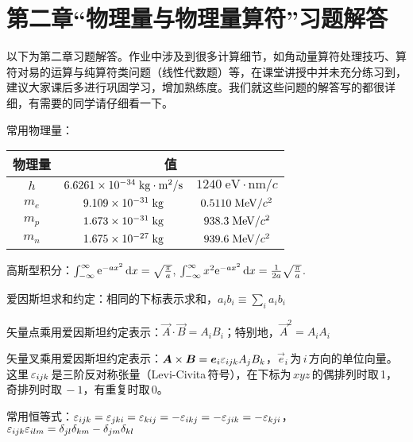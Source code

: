 \section{第二章“物理量与物理量算符”习题解答}
以下为第二章习题解答。作业中涉及到很多计算细节，{\color{red}如角动量算符处理技巧、算符对易的运算与纯算符类问题（线性代数题）等}，在课堂讲授中并未充分练习到，建议大家课后多进行巩固学习，增加熟练度。我们就这些问题的解答写的都很详细，有需要的同学请仔细看一下。


常用物理量：
\begin{table}[h]
    \centering
    \begin{tabular}{|c|c|c|}
        \hline
        物理量 & \multicolumn{2}{|c|}{值} \\
        \hline
        $h$ & $6.6261\times 10^{-34}\;\mathrm{kg\cdot m^2/s}$ & $1240\;\mathrm{eV\cdot nm}/c$ \\
        $m_e$ & $9.109\times 10^{-31}\;\mathrm{kg}$ & $0.5110\;\mathrm{MeV}/c^2$ \\
        $m_p$ & $1.673\times 10^{-31}\;\mathrm{kg}$ & $938.3\;\mathrm{MeV}/c^2$ \\
        $m_n$ & $1.675\times 10^{-27}\;\mathrm{kg}$ & $939.6\;\mathrm{MeV}/c^2$ \\
        \hline
    \end{tabular}
\end{table}

高斯型积分：$\int_{-\infty}^\infty \mathrm{e}^{-ax^2}\dd{x} = \sqrt{\frac{\pi}{a}}$, \quad
$\int_{-\infty}^\infty x^2\mathrm{e}^{-ax^2}\dd{x} = \frac{1}{2a}\sqrt{\frac{\pi}{a}}$.

爱因斯坦求和约定：相同的下标表示求和，$a_ib_i\equiv\sum_ia_ib_i$

矢量点乘用爱因斯坦约定表示：$\vec{A}\cdot\vec{B}=A_iB_i$；特别地，$\vec{A}^2=A_iA_i$

矢量叉乘用爱因斯坦约定表示：$\boldsymbol{A}\times\boldsymbol{B}=\boldsymbol{e}_i\varepsilon_{ijk} A_jB_k$，$\vec{e}_i\,$为$\,i\,$方向的单位向量。这里$\,\varepsilon_{ijk}\,$是三阶反对称张量（Levi-Civita\,符号），在下标为$\,xyz\,$的偶排列时取\,1，奇排列时取$\,-1$，有重复时取\,0。

常用恒等式：$\varepsilon_{ijk}=\varepsilon_{jki}=\varepsilon_{kij}=-\varepsilon_{ikj}=-\varepsilon_{jik}=-\varepsilon_{kji}$，$\varepsilon_{ijk}\varepsilon_{ilm}=\delta_{jl}\delta_{km}-\delta_{jm}\delta_{kl}$


